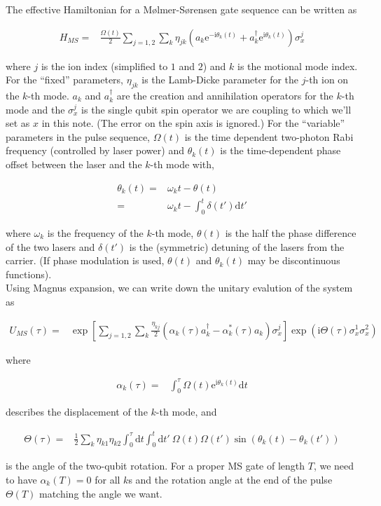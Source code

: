 \documentclass[10pt,fleqn]{article}
\newcommand{\ud}{\mathrm{d}}
\newcommand{\ue}{\mathrm{e}}
\newcommand{\ui}{\mathrm{i}}
\newcommand{\eqar}[1]
{
  \begin{align*}
    #1
  \end{align*}
}
\newcommand{\paren}[1]{{\left({#1}\right)}}
\newcommand{\sqr}[1]{{\left[{#1}\right]}}
\begin{document}
The effective Hamiltonian for a M{\o}lmer-S{\o}rensen gate sequence can be written as
\eqar{
  H_{MS}=&\frac{\Omega(t)}{2}\sum_{j=1,2}\sum_{k}\eta_{jk}\paren{a_k\ue^{-\ui\theta_k(t)}+a_k^\dagger\ue^{\ui\theta_k(t)}}\sigma^j_x
}
where $j$ is the ion index (simplified to $1$ and $2$)
and $k$ is the motional mode index.
For the ``fixed'' parameters, $\eta_{jk}$ is the Lamb-Dicke parameter for the $j$-th
ion on the $k$-th mode. $a_k$ and $a^\dagger_k$ are the creation and annihilation
operators for the $k$-th mode and the $\sigma_x^j$ is the single qubit spin operator
we are coupling to which we'll set as $x$ in this note.
(The error on the spin axis is ignored.)
For the ``variable'' parameters in the pulse sequence,
$\Omega(t)$ is the time dependent two-photon Rabi frequency (controlled by laser power)
and $\theta_k(t)$ is the time-dependent phase offset between the laser and the $k$-th
mode with,
\eqar{
  \theta_k(t)=&\omega_kt-\theta(t)\\
  =&\omega_kt-\int_0^t\delta(t')\ud t'
}
where $\omega_k$ is the frequency of the $k$-th mode,
$\theta(t)$ is the half the phase difference of the two lasers
and $\delta(t')$ is the (symmetric) detuning of the lasers from the carrier.
(If phase modulation is used, $\theta(t)$ and $\theta_k(t)$
may be discontinuous functions).\\

Using Magnus expansion, we can write down the unitary evalution of the system as
\eqar{
  U_{MS}(\tau)=&\exp\sqr{\sum_{j=1,2}\sum_{k}\frac{\eta_{kj}}{2}\paren{\alpha_k(\tau)a^\dagger_k-\alpha^*_k(\tau)a_k}\sigma^j_x}\exp\paren{\ui\Theta(\tau)\sigma^1_x\sigma^2_x}
}
where
\eqar{
  \alpha_k(\tau)=&\int_0^\tau\Omega(t)\ue^{\ui\theta_k(t)}\ud t
}
describes the displacement of the $k$-th mode, and
\eqar{
  \Theta(\tau)=&\frac{1}{2}\sum_k\eta_{k1}\eta_{k2}\int_0^\tau\!\!\ud t\int_0^t\!\!\ud t'
  \ \Omega(t)\Omega(t')\sin(\theta_k(t)-\theta_k(t'))
}
is the angle of the two-qubit rotation. For a proper MS gate of length $T$,
we need to have $\alpha_k(T)=0$ for all $k$s and the rotation angle
at the end of the pulse $\Theta(T)$ matching the angle we want.\\
\end{document}
